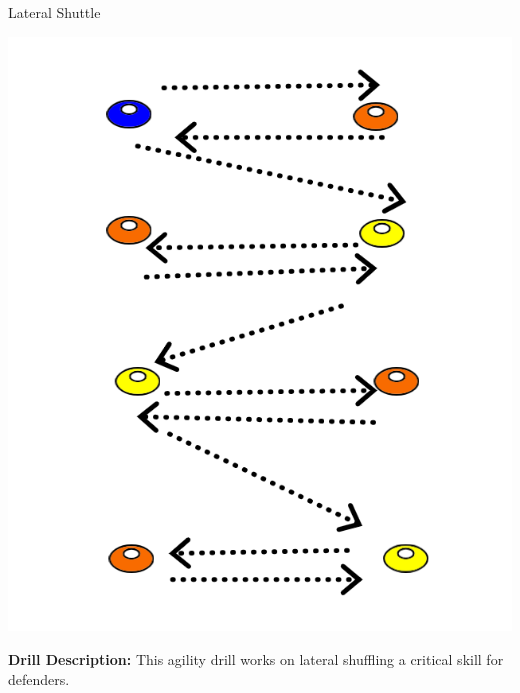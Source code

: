 
\begin{oddBlock}{Lateral Shuttle}

\begin{minipage}[t]{\linewidth}
    
    \begin{minipage}{.2\linewidth} %
        \centering
        \includegraphics[width=\textwidth]{../img/Trimmed/lateral_shuddle}
    \end{minipage}
    \hspace{0.05\linewidth}
    \begin{minipage}{.7\linewidth} %
        \textbf{Drill Description:}
        This agility drill works on lateral shuffling a critical skill for defenders. 

\end{minipage}
\end{minipage}
\end{oddBlock}
